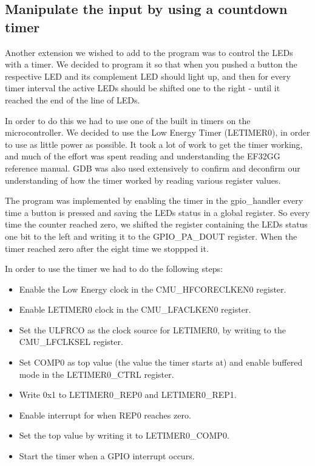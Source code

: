 \subsection{Manipulate the input by using a countdown timer} 

Another extension we wished to add to the program was to control the LEDs with a timer. We decided to program it so that when you pushed a button the respective LED and its complement LED should light up, and then for every timer interval the active LEDs should be shifted one to the right - until it reached the end of the line of LEDs. 

In order to do this we had to use one of the built in timers on the microcontroller. We decided to use the Low Energy Timer (LETIMER0), in order to use as little power as possible. It took a lot of work to get
the timer working, and much of the effort was spent reading and understanding the EF32GG reference manual. GDB was also used extensively to confirm and deconfirm our understanding of how the timer worked by reading various register values.

The program was implemented by enabling the timer in the gpio\_handler every time a button is pressed and saving the LEDs status in a global register. So every time the counter reached zero, we shifted the 
register containing the LEDs status one bit to the left and writing it to the GPIO\_PA\_DOUT register. When the timer reached zero after the eight time we stoppped it. 

In order to use the timer we had to do the following steps:

\begin{itemize}
	\item Enable the Low Energy clock in the CMU\_HFCORECLKEN0 register.
	\item Enable LETIMER0 clock in the CMU\_LFACLKEN0 register. 
	\item Set the ULFRCO as the clock source for LETIMER0, by writing to the CMU\_LFCLKSEL register. 
	\item Set COMP0 as top value (the value the timer starts at) and enable buffered mode in the LETIMER0\_CTRL register.
	\item Write 0x1 to LETIMER0\_REP0 and LETIMER0\_REP1.
	\item Enable interrupt for when REP0 reaches zero. 
	\item Set the top value by writing it to LETIMER0\_COMP0. 
	\item Start the timer when a GPIO interrupt occurs. 
\end{itemize}


